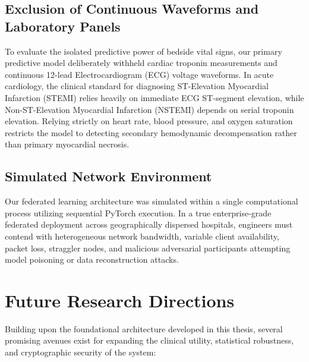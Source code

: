 \subsection{Exclusion of Continuous Waveforms and Laboratory Panels}
To evaluate the isolated predictive power of bedside vital signs, our primary predictive model deliberately withheld cardiac troponin measurements and continuous 12-lead Electrocardiogram (ECG) voltage waveforms. In acute cardiology, the clinical standard for diagnosing ST-Elevation Myocardial Infarction (STEMI) relies heavily on immediate ECG ST-segment elevation, while Non-ST-Elevation Myocardial Infarction (NSTEMI) depends on serial troponin elevation. Relying strictly on heart rate, blood pressure, and oxygen saturation restricts the model to detecting secondary hemodynamic decompensation rather than primary myocardial necrosis.

\subsection{Simulated Network Environment}
Our federated learning architecture was simulated within a single computational process utilizing sequential PyTorch execution. In a true enterprise-grade federated deployment across geographically dispersed hospitals, engineers must contend with heterogeneous network bandwidth, variable client availability, packet loss, straggler nodes, and malicious adversarial participants attempting model poisoning or data reconstruction attacks.

\section{Future Research Directions}
\label{sec:future_directions}

Building upon the foundational architecture developed in this thesis, several promising avenues exist for expanding the clinical utility, statistical robustness, and cryptographic security of the system:

